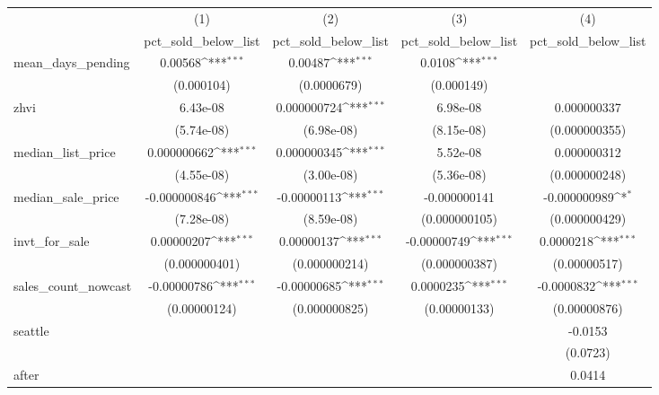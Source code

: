 {
\def\sym#1{\ifmmode^{#1}\else\(^{#1}\)\fi}
\begin{tabular}{l*{4}{c}}
\hline\hline
            &\multicolumn{1}{c}{(1)}&\multicolumn{1}{c}{(2)}&\multicolumn{1}{c}{(3)}&\multicolumn{1}{c}{(4)}\\
            &\multicolumn{1}{c}{pct\_sold\_below\_list}&\multicolumn{1}{c}{pct\_sold\_below\_list}&\multicolumn{1}{c}{pct\_sold\_below\_list}&\multicolumn{1}{c}{pct\_sold\_below\_list}\\
\hline
mean\_days\_pending&     0.00568\sym{***}&     0.00487\sym{***}&      0.0108\sym{***}&                     \\
            &  (0.000104)         & (0.0000679)         &  (0.000149)         &                     \\
[1em]
zhvi        &    6.43e-08         & 0.000000724\sym{***}&    6.98e-08         & 0.000000337         \\
            &  (5.74e-08)         &  (6.98e-08)         &  (8.15e-08)         &(0.000000355)         \\
[1em]
median\_list\_price& 0.000000662\sym{***}& 0.000000345\sym{***}&    5.52e-08         & 0.000000312         \\
            &  (4.55e-08)         &  (3.00e-08)         &  (5.36e-08)         &(0.000000248)         \\
[1em]
median\_sale\_price&-0.000000846\sym{***}& -0.00000113\sym{***}&-0.000000141         &-0.000000989\sym{*}  \\
            &  (7.28e-08)         &  (8.59e-08)         &(0.000000105)         &(0.000000429)         \\
[1em]
invt\_for\_sale&  0.00000207\sym{***}&  0.00000137\sym{***}& -0.00000749\sym{***}&   0.0000218\sym{***}\\
            &(0.000000401)         &(0.000000214)         &(0.000000387)         &(0.00000517)         \\
[1em]
sales\_count\_nowcast& -0.00000786\sym{***}& -0.00000685\sym{***}&   0.0000235\sym{***}&  -0.0000832\sym{***}\\
            &(0.00000124)         &(0.000000825)         &(0.00000133)         &(0.00000876)         \\
[1em]
seattle     &                     &                     &                     &     -0.0153         \\
            &                     &                     &                     &    (0.0723)         \\
[1em]
after       &                     &                     &                     &      0.0414         \\

\end{tabular}}
